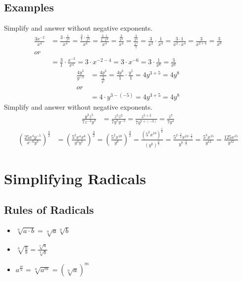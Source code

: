 \documentclass{article}
\begin{document}
    \subsection{Examples}
    Simplify and answer without negative exponents.
    \begin{align*}
        \frac{3x^{-2}}{x^4} 
        &= \frac{3 \cdot \frac{1}{x^2}}{x^4} 
        = \frac{\frac{3}{1} \cdot \frac{1}{x^2}}{x^4} 
        = \frac{\frac{3 \cdot 1}{1 \cdot x^2}}{x^4} 
        = \frac{\frac{3}{x^2}}{x^4} 
        = \frac{\frac{3}{x^2}}{\frac{x^4}{1}} 
        = \frac{3}{x^2} \cdot \frac{1}{x^4} 
        = \frac{3 \cdot 1}{x^2 \cdot x^4} 
        = \frac{3}{x^{2+4}} 
        = \frac{3}{x^6} \\ 
        or \\
        &= \frac{3}{1} \cdot \frac{x^{-2}}{x^4} 
        = 3 \cdot x^{-2-4} 
        = 3 \cdot x^{-6} 
        = 3 \cdot \frac{1}{x^6} 
        = \frac{3}{x^6}
    \end{align*}
    \begin{align*}
        \frac{4y^3}{y^{-5}} 
        &= \frac{4y^3}{\frac{1}{y^5}}
        = \frac{4y^3}{1} \cdot \frac{y^5}{1}
        = 4y^{3+5}
        = 4y^8 \\
        or \\
        &= 4 \cdot y^{3-(-5)}
        = 4y^{3+5}
        = 4y^8
    \end{align*}
    Simplify and answer without negative exponents.
    \begin{align*}
        \frac{y^3z^5}{7z^{-2}y^7} 
        &= \frac{z^5z^2}{7y^7y^{-3}} 
        = \frac{z^{5+2}}{7y^{7+(-3)}} 
        = \frac{z^7}{7y^4}
    \end{align*}
    \begin{align*}
        \left( \frac{25x^4y^{-5}}{x^{-6}y^3} \right)^\frac{3}{2}
        &= \left( \frac{5^2x^4x^6}{y^3y^5} \right)^\frac{3}{2}
        = \left( \frac{5^2x^{10}}{y^8} \right)^\frac{3}{2}
        = \frac{(5^2x^{10})^\frac{3}{2}}{(y^8)^\frac{3}{2}}
        = \frac{5^{2 \cdot \frac{3}{2}}x^{10 \cdot \frac{3}{2}}}{y^{8 \cdot \frac{3}{2}}}
        = \frac{5^3x^{15}}{y^{12}}
        = \frac{125x^{15}}{y^{12}}
    \end{align*}
    
    \section{Simplifying Radicals}
    \subsection{Rules of Radicals}
    \begin{itemize}
        \item $\sqrt[n]{a \cdot b} = \sqrt[n]{a} \sqrt[n]{b}$
        \item $\sqrt[n]{\frac{a}{b}} = \frac{\sqrt[n]{a}}{\sqrt[n]{b}}$
        \item $a^{\frac{m}{n}} = \sqrt[n]{a^m} = (\sqrt[n]{a})^m$
    \end{itemize}
\end{document}

